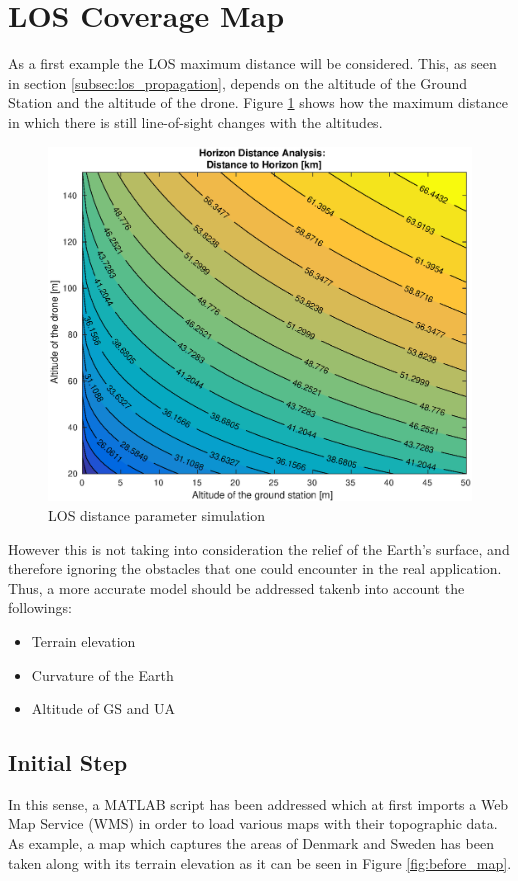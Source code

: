 \section{LOS Coverage Map}\label{sec:los_map}
As a first example the LOS maximum distance will be considered. This, as seen in section \ref{subsec:los_propagation}, depends on the altitude of the Ground Station and the altitude of the drone. Figure \ref{fig:altitude2distance} shows how the maximum distance in which there is still line-of-sight changes with the altitudes.

\begin{figure}[H]
  \centering
  \includegraphics[scale=0.70]{figures/altitude2distance.eps}
  \caption{LOS distance parameter simulation}
    \label{fig:altitude2distance}
\end{figure}

However this is not taking into consideration the relief of the Earth's surface, and therefore ignoring the obstacles that one could encounter in the real application. Thus, a more accurate model should be addressed takenb into account the followings:

\begin{itemize}
	\item Terrain elevation
	\item Curvature of the Earth
	\item Altitude of GS and UA
\end{itemize}

\subsection{Initial Step}
In this sense, a MATLAB script has been addressed which at first imports a Web Map Service (WMS) in order to load various maps with their topographic data. As example, a map which captures the areas of Denmark and Sweden has been taken along with its terrain elevation as it can be seen in Figure \ref{fig:before_map}.

